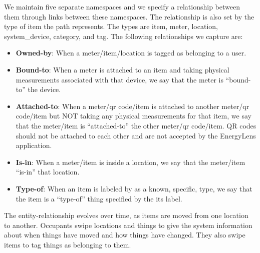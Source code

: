 We maintain five separate namespaces and we specify a relationship between them through links between 
these namespaces.  The relationship is also set by the type of item the path represents.  The types are item, meter, 
location, system\_device, category, and tag.  The following relationships we capture are:

\begin{itemize}
\item {\bf Owned-by}: When a meter/item/location is tagged as belonging to a user.
\item {\bf Bound-to}: When a meter is attached to an item and taking physical measurements associated with that 
		device, we say that the meter is ``bound-to'' the device.
\item {\bf Attached-to}: When a meter/qr code/item is attached to another meter/qr code/item but NOT taking any 
		physical measurements for that item, we say that the meter/item is ``attached-to'' the other meter/qr 
		code/item.  QR codes should not be attached to each other and are not accepted by the EnergyLens application.
\item {\bf Is-in}: When a meter/item is inside a location, we say that the meter/item ``is-in'' that location.
\item {\bf Type-of}: When an item is labeled by as a known, specific, type, we say that the item is a ``type-of'' thing 
		specified by the its label.
\end{itemize}



The entity-relationship evolves over time, as items are moved from one location to another.  Occupants swipe
locations and things to give the system information about when things have moved and how things have changed.
They also swipe items to tag things as belonging to them.






